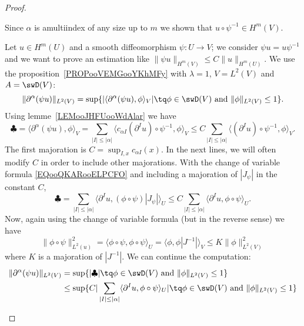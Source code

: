 \begin{proof}
\begin{subproof}
		Since \( \alpha\) is  amultiindex of any size up to \( m\) we shown that \( u\circ\psi^{-1}\in H^m(V)\).



		Let \( u\in H^m(U)\) and a smooth diffeomorphism \( \psi\colon U\to V\); we consider \( \psi u=u\psi^{-1}\) and we want to prove an estimation like \( \| \psi u \|_{H^m(V)}\leq C\| u \|_{H^m(U)}\). We use the proposition~\ref{PROPooVEMGooYKhMFy} with \( \lambda=1\), \( V=L^2(V)\) and \( A=\swD(V)\):
		\begin{equation}
			\| \partial^{\alpha}(\psi u) \|_{L^2(V)}=\sup\{ | \langle \partial^{\alpha}(\psi u), \phi\rangle_V |\tq \phi\in\swD(V)\text{ and }\| \phi \|_{L^2(V)}\leq 1 \}.
		\end{equation}
		Using lemme~\ref{LEMooJHFUooWdAlar} we have
		\begin{equation}
			\clubsuit=\langle \partial^{\alpha}(\psi u), \phi\rangle_V=\sum_{| I |\leq | \alpha |}\langle c_{\alpha I}(\partial^Iu)\circ\psi^{-1}, \phi\rangle_V\leq C\sum_{| I |\leq | \alpha |}\langle (\partial^Iu)\circ \psi^{-1}, \phi\rangle_V.
		\end{equation}
		The first majoration is \( C=\sup_{I,x}c_{\alpha I}(x)\). In the next lines, we will often modify \( C\) in order to include other majorations. With the change of variable formula \eqref{EQooQKARooELPCFO} and including a majoration of \( | J_{\psi} |\) in the constant \( C\),
		\begin{equation}
			\clubsuit=\sum_{| I |\leq | \alpha |}\langle \partial^Iu, (\phi\circ\psi)| J_{\psi} |\rangle_U\leq C\sum_{| I |\leq | \alpha |}\langle \partial^Iu, \phi\circ\psi\rangle_U.
		\end{equation}
		Now, again using the change of variable formula (but in the reverse sense) we have
		\begin{equation}
			\| \phi\circ\psi \|^2_{L^2(u)}=\langle \phi\circ\psi, \phi\circ\psi\rangle_U=\langle \phi, \phi| J^{-1} |\rangle_V\leq K\| \phi \|^2_{L^2(V)}
		\end{equation}
		where \( K\) is a majoration of \( | J^{-1} |\). We can continue the computation:
		\begin{subequations}
			\begin{align}
				\| \partial^{\alpha}(\psi u) \|_{L^2(V)} & =\sup\{ | \clubsuit |\tq \phi\in\swD(V)\text{ and }\| \phi \|_{L^2(V)}\leq 1 \}                                                                   \\
				                                         & \leq \sup\{ C|\sum_{| I |\leq | \alpha |}\langle \partial^Iu, \phi\circ\psi\rangle_U|\tq \phi\in\swD(V)\text{ and }\| \phi \|_{L^2(V)}\leq 1 \}   \\

\end{align}
\end{subequations}
\end{subproof}
\end{proof}
